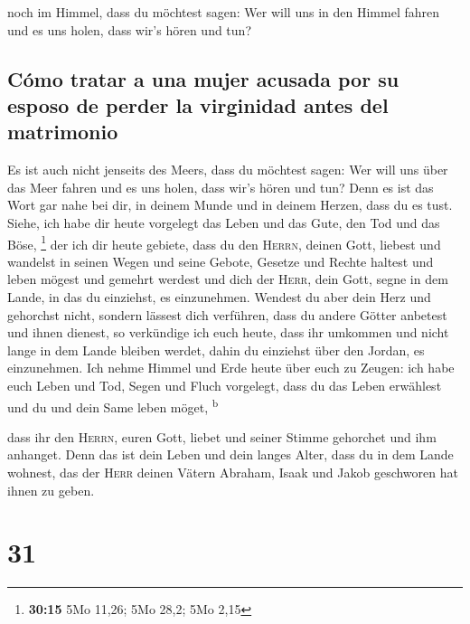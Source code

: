  noch im Himmel, dass du möchtest sagen: Wer will uns in
den Himmel fahren und es uns holen, dass wir's hören und tun?

\hypertarget{cuxf3mo-tratar-a-una-mujer-acusada-por-su-esposo-de-perder-la-virginidad-antes-del-matrimonio}{%
\subsection{Cómo tratar a una mujer acusada por su esposo de perder la
virginidad antes del
matrimonio}\label{cuxf3mo-tratar-a-una-mujer-acusada-por-su-esposo-de-perder-la-virginidad-antes-del-matrimonio}}

 Es ist auch nicht jenseits des Meers, dass du möchtest
sagen: Wer will uns über das Meer fahren und es uns holen, dass wir's
hören und tun?  Denn es ist das Wort gar nahe bei dir, in
deinem Munde und in deinem Herzen, dass du es tust. 
Siehe, ich habe dir heute vorgelegt das Leben und das Gute, den Tod und
das Böse, \footnote{\textbf{30:15} 5Mo 11,26; 5Mo 28,2; 5Mo 2,15}
 der ich dir heute gebiete, dass du den \textsc{Herrn},
deinen Gott, liebest und wandelst in seinen Wegen und seine Gebote,
Gesetze und Rechte haltest und leben mögest und gemehrt werdest und dich
der \textsc{Herr}, dein Gott, segne in dem Lande, in das du einziehst,
es einzunehmen.  Wendest du aber dein Herz und gehorchst
nicht, sondern lässest dich verführen, dass du andere Götter anbetest
und ihnen dienest,  so verkündige ich euch heute, dass
ihr umkommen und nicht lange in dem Lande bleiben werdet, dahin du
einziehst über den Jordan, es einzunehmen.  Ich nehme
Himmel und Erde heute über euch zu Zeugen: ich habe euch Leben und Tod,
Segen und Fluch vorgelegt, dass du das Leben erwählest und du und dein
Same leben möget, \textsuperscript{b}

 dass ihr den \textsc{Herrn}, euren Gott, liebet und
seiner Stimme gehorchet und ihm anhanget. Denn das ist dein Leben und
dein langes Alter, dass du in dem Lande wohnest, das der \textsc{Herr}
deinen Vätern Abraham, Isaak und Jakob geschworen hat ihnen zu geben.

\hypertarget{section-30}{%
\section{31}\label{section-30}}

